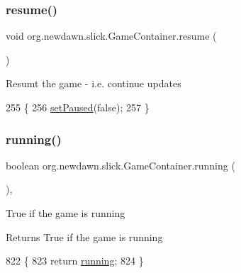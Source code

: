 \subsubsection{\texorpdfstring{resume()}{resume()}}
{\footnotesize\ttfamily void org.\+newdawn.\+slick.\+Game\+Container.\+resume (\begin{DoxyParamCaption}{ }\end{DoxyParamCaption})\hspace{0.3cm}{\ttfamily [inline]}}

Resumt the game -\/ i.\+e. continue updates 
\begin{DoxyCode}
255     \{
256         \mbox{\hyperlink{classorg_1_1newdawn_1_1slick_1_1_game_container_a8f4bc4fa90e71731f9ae4a97bba85c69}{setPaused}}(\textcolor{keyword}{false});
257     \}
\end{DoxyCode}
\mbox{\label{classorg_1_1newdawn_1_1slick_1_1_game_container_a5cb10a093281abb5b6ee60f2b18c26c3}} 
\subsubsection{\texorpdfstring{running()}{running()}}
{\footnotesize\ttfamily boolean org.\+newdawn.\+slick.\+Game\+Container.\+running (\begin{DoxyParamCaption}{ }\end{DoxyParamCaption})\hspace{0.3cm}{\ttfamily [inline]}, {\ttfamily [protected]}}

True if the game is running

\begin{DoxyReturn}{Returns}
True if the game is running 
\end{DoxyReturn}

\begin{DoxyCode}
822                                 \{
823         \textcolor{keywordflow}{return} \mbox{\hyperlink{classorg_1_1newdawn_1_1slick_1_1_game_container_a5cb10a093281abb5b6ee60f2b18c26c3}{running}};
824     \}
\end{DoxyCode}
\mbox{\label{classorg_1_1newdawn_1_1slick_1_1_game_container_acd378cace457526ea0506411a3e54503}} 
